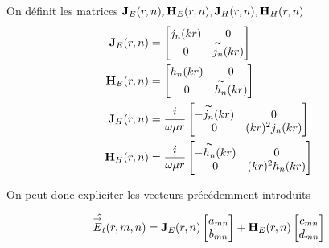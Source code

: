         \begin{defn}
            On définit les matrices \(\mathbf{J}_{E}(r,n),\mathbf{H}_{E}(r,n),\mathbf{J}_{H}(r,n),\mathbf{H}_{H}(r,n)\)
            \begin{align}
                \mathbf{J}_{E}(r,n) &=
                \begin{bmatrix}
                    j_n(kr) & 0
                    \\                
                    0 & \overset{\thicksim}{j_n}(kr)
                \end{bmatrix}
                \\
                \mathbf{H}_{E}(r,n) &=
                \begin{bmatrix}
                    h_n(kr) & 0
                    \\                
                    0 & \overset{\thicksim}{h_n}(kr)
                \end{bmatrix}
                \\
                \mathbf{J}_{H}(r,n) &= \dfrac{i}{\omega\mu r}
                \begin{bmatrix}
                    -\overset{\thicksim}{j_n}(kr) & 0
                    \\                
                    0 & (kr)^2 j_n(kr)
                \end{bmatrix}
                \\
                \mathbf{H}_{H}(r,n) &= \dfrac{i}{\omega\mu r}
                \begin{bmatrix}
                    -\overset{\thicksim}{h_n}(kr) & 0
                    \\
                    0 & (kr)^2 h_n(kr)
                \end{bmatrix}
            \end{align}
        \end{defn}

        On peut donc expliciter les vecteurs précédemment introduits

        \begin{equation}
            \hat{{\overset{\rightarrow}{E}}_t}(r,m,n) =
            \mathbf{J}_{E}(r,n)
            \begin{bmatrix}
                a_{mn}
                \\
                b_{mn}
            \end{bmatrix}
            +
            \mathbf{H}_{E}(r,n)
            \begin{bmatrix}
                c_{mn}
                \\
                d_{mn}
            \end{bmatrix}
        \end{equation}

